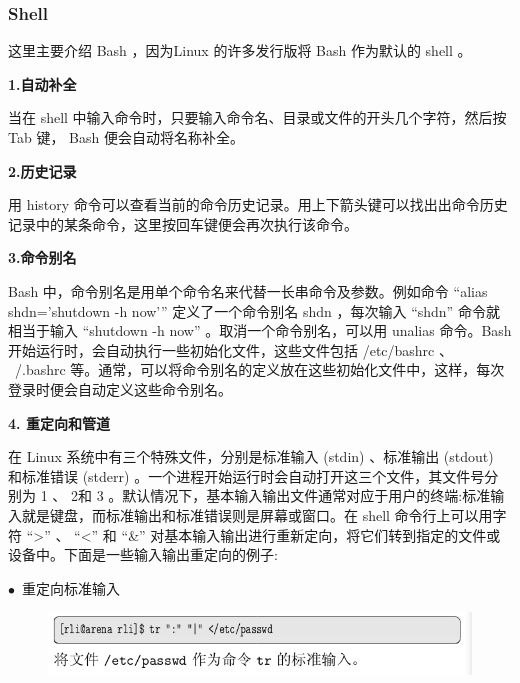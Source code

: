 \documentclass[12pt，a4paper]{article}
\numberwithin{equation}{section}
\begin{document}
\subsubsection{Shell}
这里主要介绍 Bash ，因为Linux 的许多发行版将 Bash 作为默认的 shell 。

\textbf{1.自动补全}

当在 shell 中输入命令时，只要输入命令名、目录或文件的开头几个字符，然后按 Tab 键， Bash 便会自动将名称补全。

\textbf{2.历史记录}

用 history 命令可以查看当前的命令历史记录。用上下箭头键可以找出出命令历史记录中的某条命令，这里按回车键便会再次执行该命令。

\textbf{3.命令别名}

Bash 中，命令别名是用单个命令名来代替一长串命令及参数。例如命令 “alias shdn='shutdown -h now'” 定义了一个命令别名 shdn ，每次输入 “shdn” 命令就相当于输入 “shutdown -h now” 。取消一个命令别名，可以用 unalias 命令。Bash 开始运行时，会自动执行一些初始化文件，这些文件包括
/etc/bashrc 、 ~/.bashrc 等。通常，可以将命令别名的定义放在这些初始化文件中，这样，每次登录时便会自动定义这些命令别名。

\textbf{4. 重定向和管道}

在 Linux 系统中有三个特殊文件，分别是标准输入 (stdin) 、标准输出 (stdout) 和标准错误 (stderr) 。一个进程开始运行时会自动打开这三个文件，其文件号分别为 1 、 2和 3 。默认情况下，基本输入输出文件通常对应于用户的终端:标准输入就是键盘，而标准输出和标准错误则是屏幕或窗口。在 shell 命令行上可以用字符 “>” 、 “<” 和 “\&” 对基本输入输出进行重新定向，将它们转到指定的文件或设备中。下面是一些输入输出重定向的例子:

$\bullet$~重定向标准输入
\begin{figure}[H]
\centering
\includegraphics[scale=0.6]{./figures/231.png}
\end{figure}
\end{document}
